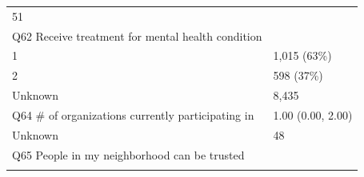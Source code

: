 \documentclass[]{article}
\begin{document}
\begin{longtable}[]{@{}ll@{}}
\begin{minipage}[t]{0.23\columnwidth}
51\strut
\end{minipage}\tabularnewline
\begin{minipage}[t]{0.71\columnwidth}\raggedright
Q62 Receive treatment for mental health condition\strut
\end{minipage} & \begin{minipage}[t]{0.23\columnwidth}\raggedright
\strut
\end{minipage}\tabularnewline
\begin{minipage}[t]{0.71\columnwidth}\raggedright
1\strut
\end{minipage} & \begin{minipage}[t]{0.23\columnwidth}\raggedright
1,015 (63\%)\strut
\end{minipage}\tabularnewline
\begin{minipage}[t]{0.71\columnwidth}\raggedright
2\strut
\end{minipage} & \begin{minipage}[t]{0.23\columnwidth}\raggedright
598 (37\%)\strut
\end{minipage}\tabularnewline
\begin{minipage}[t]{0.71\columnwidth}\raggedright
Unknown\strut
\end{minipage} & \begin{minipage}[t]{0.23\columnwidth}\raggedright
8,435\strut
\end{minipage}\tabularnewline
\begin{minipage}[t]{0.71\columnwidth}\raggedright
Q64 \# of organizations currently participating in\strut
\end{minipage} & \begin{minipage}[t]{0.23\columnwidth}\raggedright
1.00 (0.00, 2.00)\strut
\end{minipage}\tabularnewline
\begin{minipage}[t]{0.71\columnwidth}\raggedright
Unknown\strut
\end{minipage} & \begin{minipage}[t]{0.23\columnwidth}\raggedright
48\strut
\end{minipage}\tabularnewline
\begin{minipage}[t]{0.71\columnwidth}\raggedright
Q65 People in my neighborhood can be trusted\strut
\end{minipage} & \begin{minipage}[t]{0.23\columnwidth}\raggedright
\strut
\end{minipage}\tabularnewline
\begin{minipage}[t]{0.71\columnwidth}\raggedright

\end{minipage}
\end{longtable}
\end{document}

